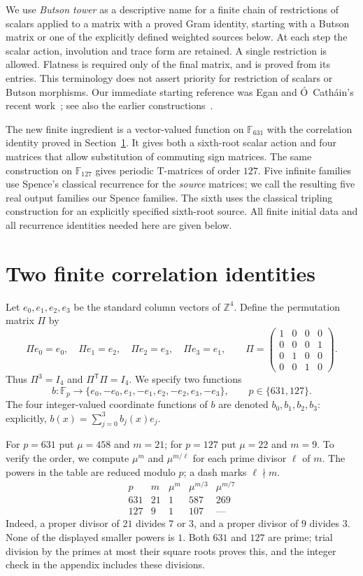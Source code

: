 \documentclass[10pt]{article}
\newcommand{\F}{\mathbb F}
\begin{document}
We use \emph{Butson tower} as a descriptive name for a finite chain of
restrictions of scalars applied to a matrix with a proved Gram identity,
starting with a Butson matrix or one of the explicitly defined weighted
sources below. At each step the scalar action, involution and trace form
are retained. A single restriction is allowed. Flatness is required only
of the final matrix, and is proved from its entries. This terminology
does not assert priority for restriction of scalars or Butson morphisms.
Our immediate starting reference was Egan and \'{O}~Cath\'ain's recent
work~\cite{complete-morphisms}; see also the earlier
constructions~\cite{morphisms,matrix-homomorphisms,unreal}.

The new finite ingredient is a vector-valued function on $\F_{631}$
with the correlation identity proved in Section~\ref{sec:finite}.
It gives both a sixth-root scalar action and four matrices that allow
substitution of commuting sign matrices. The same construction on
$\F_{127}$ gives periodic T-matrices of order $127$.
Five infinite families use Spence's classical recurrence for the
\emph{source} matrices; we call the resulting five real output families
our Spence families. The sixth uses the classical tripling construction
for an explicitly specified sixth-root source. All finite initial data and all
recurrence identities needed here are given below.

\section{Two finite correlation identities}\label{sec:finite}

Let $e_0,e_1,e_2,e_3$ be the standard column vectors of $\mathbb Z^4$.
Define the permutation matrix $\Pi$ by
\[
 \Pi e_0=e_0,\quad \Pi e_1=e_2,\quad
 \Pi e_2=e_3,\quad \Pi e_3=e_1,
 \qquad
 \Pi=\begin{pmatrix}1&0&0&0\\0&0&0&1\\0&1&0&0\\0&0&1&0\end{pmatrix}.
\]
Thus $\Pi^3=I_4$ and $\Pi^{\mathsf T}\Pi=I_4$.
We specify two functions
\[
 b\colon\F_p\longrightarrow\{e_0,-e_0,e_1,-e_1,e_2,-e_2,e_3,-e_3\},
 \qquad p\in\{631,127\}.
\]
The four integer-valued coordinate functions of $b$ are denoted
$b_0,b_1,b_2,b_3$: explicitly, $b(x)=\sum_{j=0}^3b_j(x)e_j$.

For $p=631$ put $\mu=458$ and $m=21$; for $p=127$ put $\mu=22$ and
$m=9$. To verify the order, we compute $\mu^m$ and $\mu^{m/\ell}$
for each prime divisor $\ell$ of $m$. The powers in the table are reduced
modulo $p$; a dash marks $\ell\nmid m$.
\[
\begin{array}{c|c|ccc}
p&m&\mu^m&\mu^{m/3}&\mu^{m/7}\\\hline
631&21&1&587&269\\
127&9&1&107&\text{---}
\end{array}
\]
Indeed, a proper divisor of $21$ divides $7$ or $3$, and a proper divisor
of $9$ divides $3$. None of the displayed smaller powers is $1$.
Both $631$ and $127$ are prime; trial division by the primes at most their
square roots proves this, and the integer check in the appendix includes
these divisions.
\end{document}
